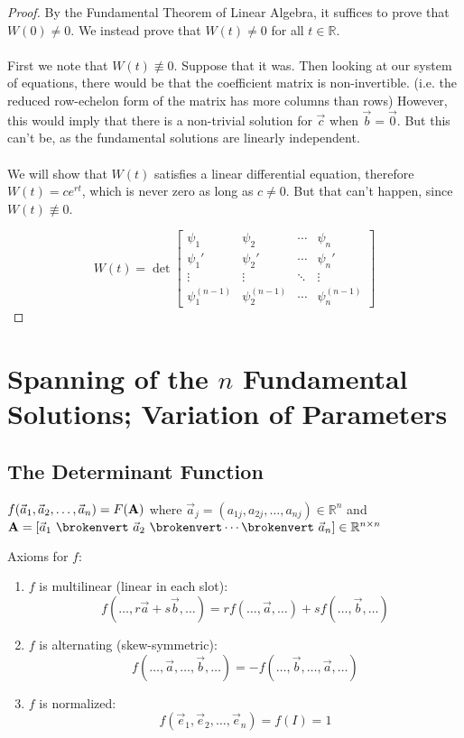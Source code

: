 \documentclass[12pt]{article}
\begin{document}
\begin{proof}
By the Fundamental Theorem of Linear Algebra, it suffices to prove that $W(0) \neq 0$. We instead prove that $W(t) \neq 0$ for all $t \in \mathbb{R}$. \\ \\
First we note that $W(t) \not \equiv 0$. Suppose that it was. Then looking at our system of equations, there would be that the coefficient matrix is non-invertible. (i.e. the reduced row-echelon form of the matrix has more columns than rows) However, this would imply that there is a non-trivial solution for $\vec{c}$ when $\vec{b} = \vec{0}$. But this can't be, as the fundamental solutions are linearly independent. \\ \\

We will show that $W(t)$ satisfies a linear differential equation, therefore $W(t) = ce^{rt}$, which is never zero as long as $c \neq 0$. But that can't happen, since $W(t) \not \equiv 0$.

\[ W(t) = \det 
\begin{bmatrix}
\psi_1 & \psi_2 & \cdots & \psi_n \\
\psi_1' & \psi_2' & \cdots & \psi_n' \\
\vdots & \vdots & \ddots & \vdots \\
\psi_1^{(n-1)} & \psi_2^{(n-1)} & \cdots & \psi_n^{(n-1)} 
\end{bmatrix}
\]


\end{proof}

\section{Spanning of the $n$ Fundamental Solutions; Variation of Parameters}

\subsection{The Determinant Function}
$f(\vec{a}_1,\vec{a}_2,\dots,\vec{a}_n) = F({\bf A})$ where $\vec{a}_j = (a_{1j}, a_{2j}, \dots, a_{nj}) \in \mathbb{R}^n$ and ${\bf A} = [\vec{a}_1 \ \brokenvert \ \vec{a}_2 \ \brokenvert \cdots \brokenvert \ \vec{a}_n] \in \mathbb{R}^{n\times n}$

Axioms for $f$:
\begin{enumerate}
\item $f$ is multilinear (linear in each slot): \[ f(\dots,r\vec{a}+s\vec{b},\dots) = rf(\dots,\vec{a},\dots) + sf(\dots,\vec{b},\dots) \]
\item $f$ is alternating (skew-symmetric): \[ f(\dots,\vec{a},\dots,\vec{b},\dots) = -f(\dots,\vec{b},\dots,\vec{a},\dots) \]
\item $f$ is normalized: \[ f(\vec{e}_1,\vec{e}_2,\dots,\vec{e}_n) = f(I) = 1 \]
\end{enumerate}
\end{document}
